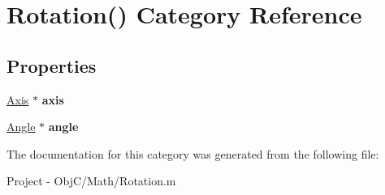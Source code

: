 \hypertarget{category_rotation_07_08}{}\section{Rotation() Category Reference}
\label{category_rotation_07_08}
\subsection*{Properties}
\begin{DoxyCompactItemize}
\item 
\hypertarget{category_rotation_07_08_a88ae2417af06fd0055e13641975ac53d}{}\hyperlink{interface_axis}{Axis} $\ast$ {\bfseries axis}\label{category_rotation_07_08_a88ae2417af06fd0055e13641975ac53d}

\item 
\hypertarget{category_rotation_07_08_ae173b04f6c1acda10fbffbc21b1ceb75}{}\hyperlink{interface_angle}{Angle} $\ast$ {\bfseries angle}\label{category_rotation_07_08_ae173b04f6c1acda10fbffbc21b1ceb75}

\end{DoxyCompactItemize}


The documentation for this category was generated from the following file\+:\begin{DoxyCompactItemize}
\item 
Project -\/ Obj\+C/\+Math/Rotation.\+m\end{DoxyCompactItemize}
